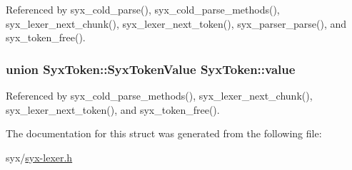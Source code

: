 Referenced by syx\_\-cold\_\-parse(), syx\_\-cold\_\-parse\_\-methods(), syx\_\-lexer\_\-next\_\-chunk(), syx\_\-lexer\_\-next\_\-token(), syx\_\-parser\_\-parse(), and syx\_\-token\_\-free().\hypertarget{struct_syx_token_9f8db78333f031cc628495af76ae9388}{
\subsubsection{\setlength{\rightskip}{0pt plus 5cm}union SyxToken::SyxTokenValue  {\bf SyxToken::value}}}
\label{struct_syx_token_9f8db78333f031cc628495af76ae9388}




Referenced by syx\_\-cold\_\-parse\_\-methods(), syx\_\-lexer\_\-next\_\-chunk(), syx\_\-lexer\_\-next\_\-token(), and syx\_\-token\_\-free().

The documentation for this struct was generated from the following file:\begin{CompactItemize}
\item 
syx/\hyperlink{syx-lexer_8h}{syx-lexer.h}\end{CompactItemize}
